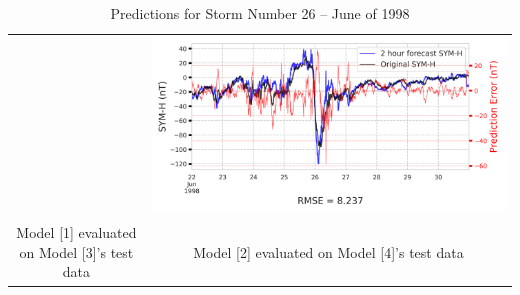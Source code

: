 \documentclass[draft,sw]{agutexSI2019}
\begin{document}
\begin{table}
\begin{tabular}{cc}
&
\includegraphics[width=0.49\linewidth]{paper_plots/2h_swics_model_on_no_swics/2h_swics_model_on_no_swics_storm_26.png}
\\
Model [1] evaluated on Model [3]'s test data & Model [2] evaluated on Model [4]'s test data
\vspace*{12pt}
\\
\end{tabular}
\caption{Predictions for Storm Number 26 -- June of 1998}
\label{storm-26}
\end{table}
\end{document}
